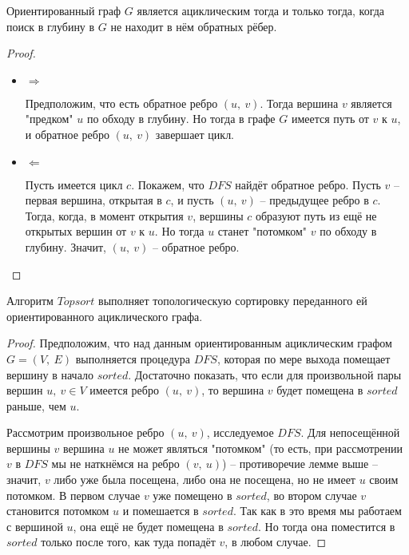 \documentclass[a4paper,12pt]{article}
\begin{document}
\begin{fulllemma}
Ориентированный граф $G$ является ациклическим тогда и только тогда, когда поиск в глубину в $G$ не находит в нём обратных рёбер.
\end{fulllemma}
\begin{proof}
\begin{itemize}
    \item $\Longrightarrow$
    
    Предположим, что есть обратное ребро $(u,\ v)$. Тогда вершина $v$ является "предком" $u$ по обходу в глубину. Но тогда в графе $G$ имеется путь от $v$ к $u$, и обратное ребро $(u,\ v)$ завершает цикл.
    
    \item $\Longleftarrow$
    
    Пусть имеется цикл $c$. Покажем, что $DFS$ найдёт обратное ребро. Пусть $v$ -- первая вершина, открытая в $c$, и пусть $(u,\ v)$ -- предыдущее ребро в $c$. Тогда, когда, в момент открытия $v$, вершины $c$ образуют путь из ещё не открытых вершин от $v$ к $u$. Но тогда $u$ станет "потомком" $v$ по обходу в глубину. Значит, $(u,\ v)$ -- обратное ребро.
\end{itemize}
\end{proof}
\begin{theorem}
    Алгоритм $Topsort$ выполняет топологическую сортировку переданного ей ориентированного ациклического графа.
\end{theorem}
\begin{proof}
    Предположим, что над данным ориентированным ациклическим графом $G = (V,\ E)$ выполняется процедура $DFS$, которая по мере выхода помещает вершину в начало $sorted$. Достаточно показать, что если для произвольной пары вершин $u,\ v \in V$ имеется ребро $(u,\ v)$, то вершина $v$ будет помещена в $sorted$ раньше, чем $u$.
    
    Рассмотрим произвольное ребро $(u,\ v)$, исследуемое $DFS$. Для непосещённой вершины $v$ вершина $u$ не может являться "потомком" (то есть, при рассмотрении $v$ в $DFS$ мы не наткнёмся на ребро $(v,\ u)$) -- противоречие лемме выше -- значит, $v$ либо уже была посещена, либо она не посещена, но не имеет $u$ своим потомком. В первом случае $v$ уже помещено в $sorted$, во втором случае $v$ становится потомком $u$ и помешается в $sorted$. Так как в это время мы работаем с вершиной $u$, она ещё не будет помещена в $sorted$. Но тогда она поместится в $sorted$ только после того, как туда попадёт $v$, в любом случае.
\end{proof}
\end{document}
